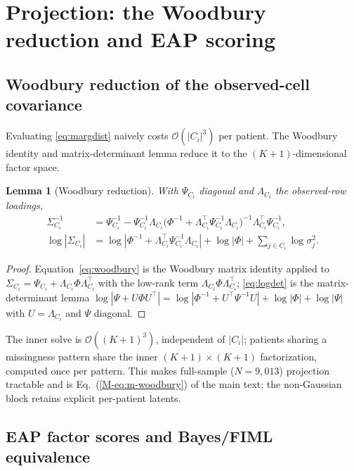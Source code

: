\documentclass[11pt]{article}
\theoremstyle{plain}
\newtheorem{lemma}{Lemma}
\theoremstyle{definition}
\newcommand{\MEq}[1]{Eq.~(\ref{M-#1})}
\begin{document}
\section{Projection: the Woodbury reduction and EAP scoring}
\label{sec:project}

\subsection{Woodbury reduction of the observed-cell covariance}
\label{sub:woodbury}

Evaluating \eqref{eq:margdist} naively costs $\mathcal{O}(|C_i|^3)$ per patient. The
Woodbury identity and matrix-determinant lemma reduce it to the $(K{+}1)$-dimensional
factor space.

\begin{lemma}[Woodbury reduction]\label{lem:woodbury}
With $\Psi_{C_i}$ diagonal and $\Lambda_{C_i}$ the observed-row loadings,
\begin{align}
  \Sigma_{C_i}^{-1} &= \Psi_{C_i}^{-1}-\Psi_{C_i}^{-1}\Lambda_{C_i}
      \bigl(\Phi^{-1}+\Lambda_{C_i}^{\top}\Psi_{C_i}^{-1}\Lambda_{C_i}\bigr)^{-1}
      \Lambda_{C_i}^{\top}\Psi_{C_i}^{-1}, \label{eq:woodbury}\\[2pt]
  \log\!\left|\Sigma_{C_i}\right| &=
      \log\!\left|\Phi^{-1}+\Lambda_{C_i}^{\top}\Psi_{C_i}^{-1}\Lambda_{C_i}\right|
      +\log|\Phi|+\!\!\sum_{j\in C_i}\!\log\sigma_j^2 .
      \label{eq:logdet}
\end{align}
\end{lemma}
\begin{proof}
Equation~\eqref{eq:woodbury} is the Woodbury matrix identity applied to
$\Sigma_{C_i}=\Psi_{C_i}+\Lambda_{C_i}\Phi\Lambda_{C_i}^{\top}$ with the low-rank term
$\Lambda_{C_i}\Phi\Lambda_{C_i}^{\top}$; \eqref{eq:logdet} is the matrix-determinant lemma
$\log|\Psi+U\Phi U^\top|=\log|\Phi^{-1}+U^\top\Psi^{-1}U|+\log|\Phi|+\log|\Psi|$ with
$U=\Lambda_{C_i}$ and $\Psi$ diagonal.
\end{proof}
\noindent
The inner solve is $\mathcal{O}((K{+}1)^3)$, independent of $|C_i|$; patients sharing a
missingness pattern share the inner $(K{+}1)\times(K{+}1)$ factorization, computed once per
pattern. This makes full-sample ($N=9{,}013$) projection tractable and is \MEq{eq:m-woodbury}
of the main text; the non-Gaussian block retains explicit per-patient latents.

\subsection{EAP factor scores and Bayes/FIML equivalence}
\label{sub:eap}
\end{document}
